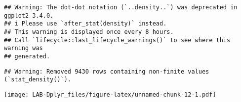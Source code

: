 \documentclass[
]{article}
\begin{document}
\begin{verbatim}
## Warning: The dot-dot notation (`..density..`) was deprecated in ggplot2 3.4.0.
## i Please use `after_stat(density)` instead.
## This warning is displayed once every 8 hours.
## Call `lifecycle::last_lifecycle_warnings()` to see where this warning was
## generated.
\end{verbatim}

\begin{verbatim}
## Warning: Removed 9430 rows containing non-finite values (`stat_density()`).
\end{verbatim}

\texttt{[image: LAB-Dplyr\_files/figure-latex/unnamed-chunk-12-1.pdf]}
\end{document}
